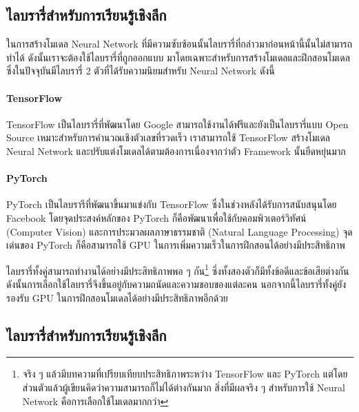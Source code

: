 \subsection{ไลบรารี่สำหรับการเรียนรู้เชิงลึก}

ในการสร้างโมเดล Neural Network ที่มีความซับซ้อนนั้นไลบรารี่ที่กล่าวมาก่อนหน้านี้นั้นไม่สามารถทำได้ ดังนั้นเราจะต้องใช้ไลบรารี่ที่ถูกออกแบบ%
มาโดยเฉพาะสำหรับการสร้างโมเดลและฝึกสอนโมเดล ซึ่งในปัจจุบันมีไลบรารี่ 2 ตัวที่ได้รับความนิยมสำหรับ Neural Network ดังนี้

\paragraph{TensorFlow}
TensorFlow เป็นไลบรารี่ที่พัฒนาโดย Google สามารถใช้งานได้ฟรีและยังเป็นไลบรารี่แบบ Open Source เหมาะสำหรับการคำนวณเชิงตัวเลขที่รวดเร็ว 
เราสามารถใช้ TensorFlow สร้างโมเดล Neural Network และปรับแต่งโมเดลได้ตามต้องการเนื่องจากว่าตัว Framework นั้นยืดหยุ่นมาก

\paragraph{PyTorch} 
PyTorch เป็นไลบรารีที่พัฒนาขึ้นมาแข่งกับ TensorFlow ซึ่งในช่วงหลังได้รับการสนับสนุนโดย Facebook โดยจุดประสงค์หลักของ PyTorch 
ก็คือพัฒนาเพื่อใช้กับคอมพิวเตอร์วิทัศน์ (Computer Vision) และการประมวลผลภาษาธรรมชาติ (Natural Language Processing) 
จุดเด่นของ PyTorch ก็คือสามารถใช้ GPU ในการเพิ่มความเร็วในการฝึกสอนได้อย่างมีประสิทธิภาพ

ไลบรารี่ทั้งคู่สามารถทำงานได้อย่างมีประสิทธิภาพพอ ๆ กัน\footnote{จริง ๆ แล้วมีบทความที่เปรียบเทียบประสิทธิภาพระหว่าง TensorFlow และ 
PyTorch แต่โดยส่วนตัวแล้วผู้เขียนคิดว่าความสามารถก็ไม่ได้ต่างกันมาก สิ่งที่มีผลจริง ๆ สำหรับการใช้ Neural Network คือการเลือกใช้โมเดลมากกว่า}
ซึ่งทั้งสองตัวก็มีทั้งข้อดีและข้อเสียต่างกัน ดังนั้นการเลือกใช้ไลบรารี่จึงขึ้นอยู่กับความถนัดและความชอบของแต่ละคน นอกจากนี้ไลบรารี่ทั้งคู่ยังรองรับ
GPU ในการฝึกสอนโมเดลได้อย่างมีประสิทธิภาพอีกด้วย

\subsection{ไลบรารี่สำหรับการเรียนรู้เชิงลึก}

